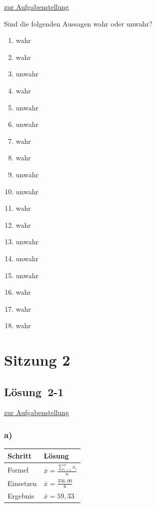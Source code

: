 \documentclass[
  11pt,
  ngerman,
  a4paper,
]{report}
\providecommand{\tightlist}{%
  \setlength{\itemsep}{0pt}\setlength{\parskip}{0pt}}
\begin{document}
\protect\hyperlink{aufgabe-1-5}{zur Aufgabenstellung}

Sind die folgenden Aussagen wahr oder unwahr?

\begin{enumerate}
\def\labelenumi{\alph{enumi})}
\tightlist
\item
  wahr
\item
  wahr
\item
  unwahr
\item
  wahr
\item
  unwahr
\item
  unwahr
\item
  wahr
\item
  wahr
\item
  unwahr
\item
  unwahr
\item
  wahr
\item
  wahr
\item
  unwahr
\item
  unwahr
\item
  unwahr
\item
  wahr
\item
  wahr
\item
  wahr
\end{enumerate}

\hypertarget{sitzung-2}{%
\section*{Sitzung 2}\label{sitzung-2}}

\hypertarget{loesung-2-1}{%
\subsection{Lösung~2-1}\label{loesung-2-1}}

\protect\hyperlink{aufgabe-2-1}{zur Aufgabenstellung}

\hypertarget{a-2}{%
\subsubsection{a)}\label{a-2}}

\begin{table}[H]
\centering
\begin{tabular}{ll}
\toprule
\textbf{Schritt} & \textbf{Lösung}\\
\midrule
Formel & $\bar{x}=\frac{\sum\limits_{i=1}^{n}x_{i}}{n}$\\
Einsetzen & $\bar{x}=\frac{356{,}00}{6}$\\
Ergebnis & $\bar{x}=59{,}33$\\
\bottomrule
\end{tabular}
\end{table}
\end{document}
